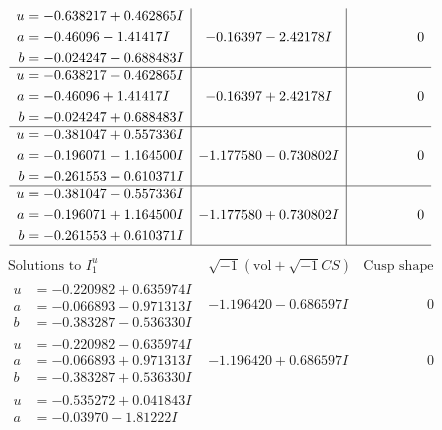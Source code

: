 \documentclass[1p]{elsarticle_modified}
\theoremstyle{definition}
\newcommand{\I}{\sqrt{-1}}
\begin{document}
$$\begin{array}{c|c|c}
\begin{aligned}
u &= -0.638217 + 0.462865 I \\
a &= -0.46096 - 1.41417 I \\
b &= -0.024247 - 0.688483 I\end{aligned}
 & -0.16397 - 2.42178 I & \phantom{-0.000000 } 0 \\ \hline\begin{aligned}
u &= -0.638217 - 0.462865 I \\
a &= -0.46096 + 1.41417 I \\
b &= -0.024247 + 0.688483 I\end{aligned}
 & -0.16397 + 2.42178 I & \phantom{-0.000000 } 0 \\ \hline\begin{aligned}
u &= -0.381047 + 0.557336 I \\
a &= -0.196071 - 1.164500 I \\
b &= -0.261553 - 0.610371 I\end{aligned}
 & -1.177580 - 0.730802 I & \phantom{-0.000000 } 0 \\ \hline\begin{aligned}
u &= -0.381047 - 0.557336 I \\
a &= -0.196071 + 1.164500 I \\
b &= -0.261553 + 0.610371 I\end{aligned}
 & -1.177580 + 0.730802 I & \phantom{-0.000000 } 0\\
 \hline 
 \end{array}$$\newpage$$\begin{array}{c|c|c}  
\text{Solutions to }I^u_{1}& \I (\text{vol} + \sqrt{-1}CS) & \text{Cusp shape}\\
 \hline 
\begin{aligned}
u &= -0.220982 + 0.635974 I \\
a &= -0.066893 - 0.971313 I \\
b &= -0.383287 - 0.536330 I\end{aligned}
 & -1.196420 - 0.686597 I & \phantom{-0.000000 } 0 \\ \hline\begin{aligned}
u &= -0.220982 - 0.635974 I \\
a &= -0.066893 + 0.971313 I \\
b &= -0.383287 + 0.536330 I\end{aligned}
 & -1.196420 + 0.686597 I & \phantom{-0.000000 } 0 \\ \hline\begin{aligned}
u &= -0.535272 + 0.041843 I \\
a &= -0.03970 - 1.81222 I \\

\end{aligned}
\end{array}$$
\end{document}

